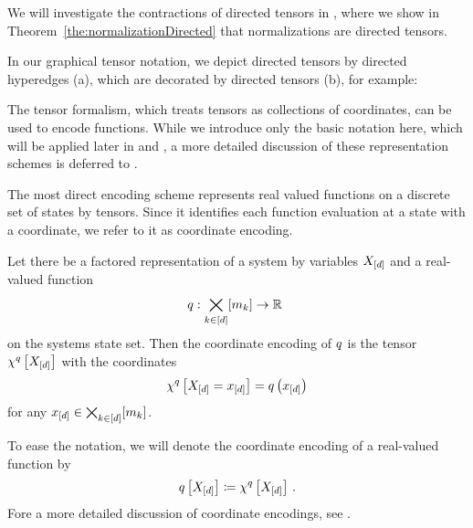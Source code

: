 We will investigate the contractions of directed tensors in , where we show in Theorem~\ref{the:normalizationDirected} that normalizations are directed tensors.


In our graphical tensor notation, we depict directed tensors by directed hyperedges (a), which are decorated by directed tensors (b), for example:
	\begin{center}
		
	\end{center}



\sect{\bnencoding}

The tensor formalism, which treats tensors as collections of coordinates, can be used to encode functions.
While we introduce only the basic notation here, which will be applied later in  and , a more detailed discussion of these representation schemes is deferred to .


The most direct encoding scheme represents real valued functions on a discrete set of states by tensors.
Since it identifies each function evaluation at a state with a coordinate, we refer to it as coordinate encoding.

\begin{definition}\label{def:notationCoordinateEncoding}
	Let there be a factored representation of a system by variables $X_{[d]}$ and a real-valued function
	\begin{align*}
		q : \bigtimes_{k\in[d]}[m_{k}] \rightarrow \mathbb{R} \
	\end{align*}
	on the systems state set.
	Then the coordinate encoding of $q$ is the tensor $\chi^{q}\left[X_{[d]}\right]$ with the coordinates
	\begin{align*}
		\chi^{q}\left[X_{[d]}=x_{[d]}\right] = q\left(x_{[d]}\right)
	\end{align*}
	for any $x_{[d]}\in\bigtimes_{k\in[d]}[m_{k}]$.
\end{definition}

To ease the notation, we will denote the coordinate encoding of a real-valued function by
\begin{align*}
	q\left[X_{[d]}\right]
	\coloneqq \chi^{q}\left[X_{[d]}\right] \, .
\end{align*}
Fore a more detailed discussion of coordinate encodings, see .


